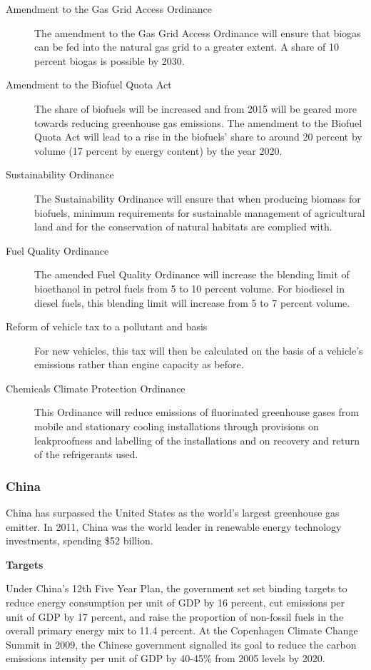 \begin{description}
	\item[Amendment to the Gas Grid Access Ordinance] The amendment to the Gas Grid Access Ordinance will ensure that biogas can be fed into the natural gas grid to a greater extent. A share of 10 percent biogas is possible by 2030.
	\item[Amendment to the Biofuel Quota Act] The share of biofuels will be increased and from 2015 will be geared more towards reducing greenhouse gas emissions. The amendment to the Biofuel Quota Act will lead to a rise in the biofuels’ share to around 20 percent by volume (17 percent by energy content) by the year 2020.
	\item[Sustainability Ordinance] The Sustainability Ordinance will ensure that when producing biomass for biofuels, minimum requirements for sustainable management of agricultural land and for the conservation of natural habitats are complied with.
	\item[Fuel Quality Ordinance] The amended Fuel Quality Ordinance will increase the blending limit of bioethanol in petrol fuels from 5 to 10 percent volume. For biodiesel in diesel fuels, this blending limit will increase from 5 to 7 percent volume.
	\item[Reform of vehicle tax to a pollutant and  basis] For new vehicles, this tax will then be calculated on the basis of a vehicle's emissions rather than engine capacity as before.
	\item[Chemicals Climate Protection Ordinance] This Ordinance will reduce emissions of fluorinated greenhouse gases from mobile and stationary cooling installations through provisions on leakproofness and labelling of the installations and on recovery and return of the refrigerants used.
\end{description}



	\subsubsection{China}
	

China has surpassed the United States as the world’s largest greenhouse gas emitter. 
In 2011, China was the world leader in renewable energy technology investments, spending \$52 billion.



\textbf{Targets}



Under China’s 12th Five Year Plan, the government set set binding targets to reduce energy consumption per unit of GDP by 16 percent, cut  emissions per unit of GDP by 17 percent, and raise the proportion of non-fossil fuels in the overall primary energy mix to 11.4 percent.  
At the Copenhagen Climate Change Summit in 2009, the Chinese government signalled its goal to reduce the carbon emissions intensity per unit of GDP by 40-45\% from 2005 levels by 2020.



